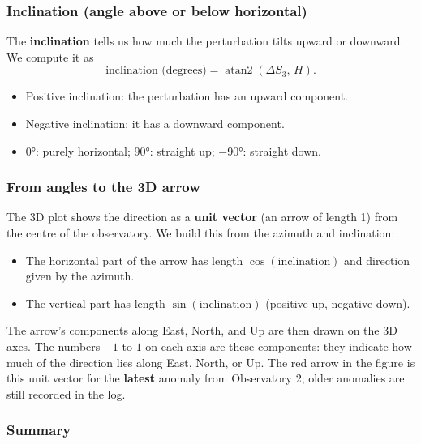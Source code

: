 \documentclass[11pt]{article}
\begin{document}
\subsubsection{\textbf{Inclination (angle above or below horizontal)}}

The \textbf{inclination} tells us how much the perturbation tilts upward or downward. We compute it as
\begin{equation}
  \text{inclination (degrees)} = \operatorname{atan2}(\Delta S_3,\, H).
\end{equation}
\begin{itemize}
  \item Positive inclination: the perturbation has an upward component.
  \item Negative inclination: it has a downward component.
  \item \(0°\): purely horizontal; \(90°\): straight up; \(-90°\): straight down.
\end{itemize}

\subsubsection{\textbf{From angles to the 3D arrow}}

The 3D plot shows the direction as a \textbf{unit vector} (an arrow of length 1) from the centre of the observatory. We build this from the azimuth and inclination:
\begin{itemize}
  \item The horizontal part of the arrow has length \(\cos(\text{inclination})\) and direction given by the azimuth.
  \item The vertical part has length \(\sin(\text{inclination})\) (positive up, negative down).
\end{itemize}
The arrow’s components along East, North, and Up are then drawn on the 3D axes. The numbers \(-1\) to \(1\) on each axis are these components: they indicate how much of the direction lies along East, North, or Up. The red arrow in the figure is this unit vector for the \textbf{latest} anomaly from Observatory 2; older anomalies are still recorded in the log.

\subsubsection{\textbf{Summary}}
\end{document}
